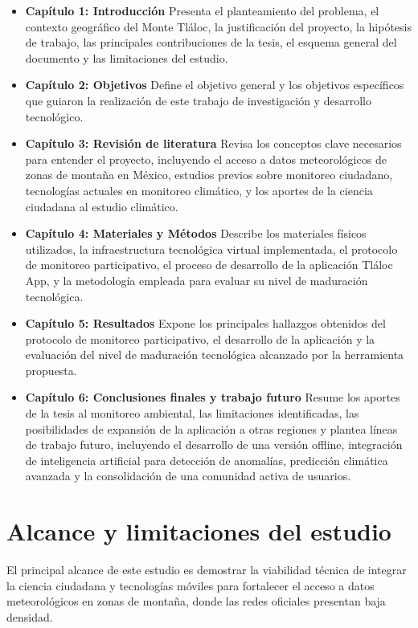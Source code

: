 \begin{itemize}
    \item \textbf{Capítulo 1: Introducción} Presenta el planteamiento del problema, el contexto geográfico del Monte Tláloc, la justificación del proyecto, la hipótesis de trabajo, las principales contribuciones de la tesis, el esquema general del documento y las limitaciones del estudio.
    
    \item \textbf{Capítulo 2: Objetivos} Define el objetivo general y los objetivos específicos que guiaron la realización de este trabajo de investigación y desarrollo tecnológico.
    
    \item \textbf{Capítulo 3: Revisión de literatura} Revisa los conceptos clave necesarios para entender el proyecto, incluyendo el acceso a datos meteorológicos de zonas de montaña en México, estudios previos sobre monitoreo ciudadano, tecnologías actuales en monitoreo climático, y los aportes de la ciencia ciudadana al estudio climático.
    
    \item \textbf{Capítulo 4: Materiales y Métodos} Describe los materiales físicos utilizados, la infraestructura tecnológica virtual implementada, el protocolo de monitoreo participativo, el proceso de desarrollo de la aplicación Tláloc App, y la metodología empleada para evaluar su nivel de maduración tecnológica.
    
    \item \textbf{Capítulo 5: Resultados} Expone los principales hallazgos obtenidos del protocolo de monitoreo participativo, el desarrollo de la aplicación y la evaluación del nivel de maduración tecnológica alcanzado por la herramienta propuesta.
    
    \item \textbf{Capítulo 6: Conclusiones finales y trabajo futuro} Resume los aportes de la tesis al monitoreo ambiental, las limitaciones identificadas, las posibilidades de expansión de la aplicación a otras regiones y plantea líneas de trabajo futuro, incluyendo el desarrollo de una versión offline, integración de inteligencia artificial para detección de anomalías, predicción climática avanzada y la consolidación de una comunidad activa de usuarios.
\end{itemize}



\section{Alcance y limitaciones del estudio}
El principal alcance de este estudio es demostrar la viabilidad técnica de integrar la ciencia ciudadana y tecnologías móviles para fortalecer el acceso a datos meteorológicos en zonas de montaña, donde las redes oficiales presentan baja densidad.

